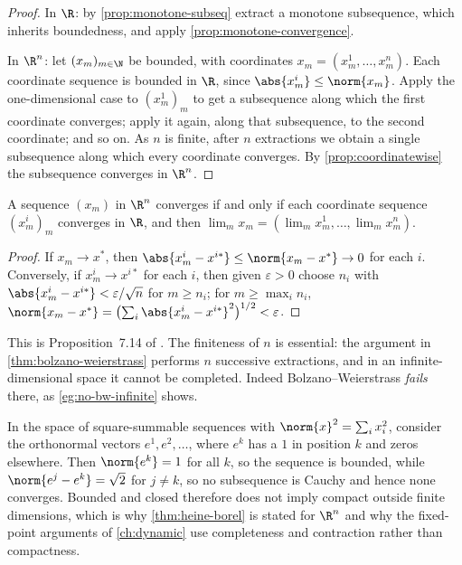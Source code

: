 \begin{proof}
	In $\R$: by \autoref{prop:monotone-subseq} extract a monotone subsequence, which
	inherits boundedness, and apply \autoref{prop:monotone-convergence}.

	In $\R^n$: let $(x_m)_{m\in\N}$ be bounded, with coordinates
	$x_m=(x^1_m,\dots,x^n_m)$. Each coordinate sequence is bounded in $\R$, since
	$\abs{x^i_m}\leq\norm{x_m}$. Apply the one-dimensional case to
	$(x^1_m)_m$ to get a subsequence along which the first coordinate converges;
	apply it again, along that subsequence, to the second coordinate; and so on. As
	$n$ is finite, after $n$ extractions we obtain a single subsequence along which
	every coordinate converges. By \autoref{prop:coordinatewise} the subsequence
	converges in $\R^n$.
\end{proof}

\begin{proposition}\label{prop:coordinatewise}
	A sequence $(x_m)$ in $\R^n$ converges if and only if each coordinate sequence
	$(x^i_m)_m$ converges in $\R$, and then
	$\lim_mx_m=(\lim_mx^1_m,\dots,\lim_mx^n_m)$.
\end{proposition}

\begin{proof}
	If $x_m\to x^\ast$, then $\abs{x^i_m-x^{i\ast}}\leq\norm{x_m-x^\ast}\to0$ for
	each $i$. Conversely, if $x^i_m\to x^{i\ast}$ for each $i$, then given
	$\varepsilon>0$ choose $n_i$ with $\abs{x^i_m-x^{i\ast}}<\varepsilon/\sqrt n$
	for $m\geq n_i$; for $m\geq\max_in_i$,
	$\norm{x_m-x^\ast}=\bigl(\sum_i\abs{x^i_m-x^{i\ast}}^2\bigr)^{1/2}<\varepsilon$.
\end{proof}

This is Proposition~7.14 of \textcite{fukuda2026notes}
\autocite[slide 48]{fukuda2026analysis}. The finiteness of $n$ is essential: the
argument in \autoref{thm:bolzano-weierstrass} performs $n$ successive
extractions, and in an infinite-dimensional space it cannot be completed. Indeed
Bolzano--Weierstrass \emph{fails} there, as \autoref{eg:no-bw-infinite} shows.

\begin{eg}\label{eg:no-bw-infinite}
	In the space of square-summable sequences with
	$\norm{x}^2=\sum_ix_i^2$, consider the orthonormal vectors
	$e^1,e^2,\dots$, where $e^k$ has a $1$ in position $k$ and zeros elsewhere. Then
	$\norm{e^k}=1$ for all $k$, so the sequence is bounded, while
	$\norm{e^j-e^k}=\sqrt2$ for $j\neq k$, so no subsequence is Cauchy and hence
	none converges. Bounded and closed therefore does not imply compact outside
	finite dimensions, which is why \autoref{thm:heine-borel} is stated for $\R^n$
	and why the fixed-point arguments of \autoref{ch:dynamic} use completeness and
	contraction rather than compactness.
\end{eg}

